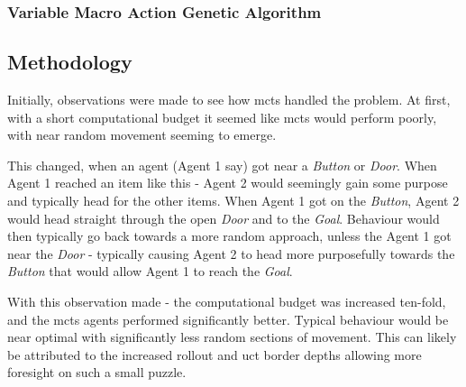 \documentclass{IEEEtran}
\begin{document}
\subsubsection{Variable Macro Action Genetic Algorithm}

\subsection{Methodology}
Initially, observations were made to see how \gls{mcts} handled the problem. At first, with a short computational budget it seemed like \gls{mcts} would perform poorly, with near random movement seeming to emerge.

This changed, when an agent (Agent 1 say) got near a \emph{Button} or \emph{Door}. When Agent 1 reached an item like this - Agent 2 would seemingly gain some purpose and typically head for the other items. When Agent 1 got on the \emph{Button}, Agent 2 would head straight through the open \emph{Door} and to the \emph{Goal}. Behaviour would then typically go back towards a more random approach, unless the Agent 1 got near the \emph{Door} - typically causing Agent 2 to head more purposefully towards the \emph{Button} that would allow Agent 1 to reach the \emph{Goal}.

With this observation made - the computational budget was increased ten-fold, and the \gls{mcts} agents performed significantly better. Typical behaviour would be near optimal with significantly less random sections of movement. This can likely be attributed to the increased rollout and uct border depths allowing more foresight on such a small puzzle.
\end{document}
